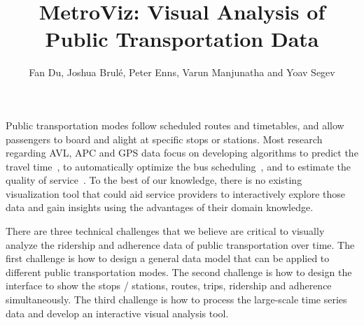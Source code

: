 \documentclass[journal]{vgtc}                %
\title{MetroViz: Visual Analysis of Public Transportation Data}
\author{Fan Du, Joshua Brulé, Peter Enns, Varun Manjunatha and Yoav Segev}
\begin{document}


\maketitle

Public transportation modes follow scheduled routes and timetables, and allow passengers to board and alight at specific stops or stations. Most research regarding AVL, APC and GPS data focus on developing algorithms to predict the travel time~\cite{Lee:2012:HNF:2424321.2424357,Tiesyte2008,Predic2007}, to automatically optimize the bus scheduling~\cite{4658140,Yu2007}, and to estimate the quality of service~\cite{camus2005estimation,hammerle2005use}. To the best of our knowledge, there is no existing visualization tool that could aid service providers to interactively explore those data and gain insights using the advantages of their domain knowledge.

There are three technical challenges that we believe are critical to visually analyze the ridership and adherence data of public transportation over time. The first challenge is how to design a general data model that can be applied to different public transportation modes. The second challenge is how to design the interface to show the stops / stations, routes, trips, ridership and adherence simultaneously. The third challenge is how to process the large-scale time series data and develop an interactive visual analysis tool.
\end{document}
